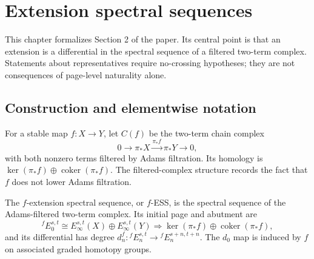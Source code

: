 \chapter{Extension spectral sequences}
\label{chap:extension-ss}

This chapter formalizes Section 2 of the paper.  Its central point is that an
extension is a differential in the spectral sequence of a filtered two-term
complex.  Statements about representatives require no-crossing hypotheses;
they are not consequences of page-level naturality alone.

\section{Construction and elementwise notation}

\begin{definition}
  \label{def:filtered-two-term-complex}
  \notready
  For a stable map $f:X\to Y$, let $C(f)$ be the two-term chain complex
  \[
    0\longrightarrow\pi_*X\xrightarrow{\pi_*f}\pi_*Y
      \longrightarrow0,
  \]
  with both nonzero terms filtered by Adams filtration.  Its homology is
  $\ker(\pi_*f)\oplus\operatorname{coker}(\pi_*f)$.  The filtered-complex
  structure records the fact that $f$ does not lower Adams filtration.
\end{definition}



\begin{definition}
  \label{def:f-extension-ss}
  \notready
  The $f$-extension spectral sequence, or $f$-ESS, is the spectral sequence of
  the Adams-filtered two-term complex.  Its initial page and abutment are
  \[
    {}^fE_0^{s,t}\cong E_\infty^{s,t}(X)\oplus
      E_\infty^{s,t}(Y)
    \Longrightarrow
    \ker(\pi_*f)\oplus\operatorname{coker}(\pi_*f),
  \]
  and its differential has degree
  $d_n^f:{}^fE_n^{s,t}\to{}^fE_n^{s+n,t+n}$.  The $d_0$ map is induced by
  $f$ on associated graded homotopy groups.
\end{definition}

